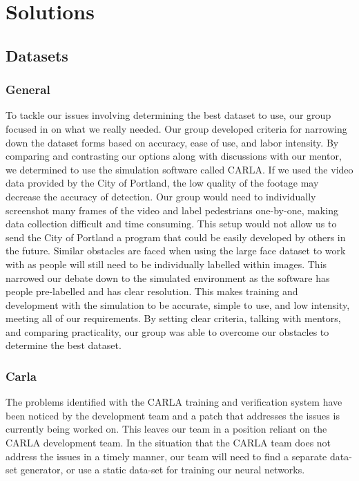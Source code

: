 \section{Solutions}
\subsection{Datasets}
\subsubsection{General}
To tackle our issues involving determining the best dataset to use, our group focused in on what we really needed. Our group developed criteria for narrowing down the dataset forms based on accuracy, ease of use, and labor intensity. By comparing and contrasting our options along with discussions with our mentor, we determined to use the simulation software called CARLA. If we used the video data provided by the City of Portland, the low quality of the footage may decrease the accuracy of detection. Our group would need to individually screenshot many frames of the video and label pedestrians one-by-one, making data collection difficult and time consuming. This setup would not allow us to send the City of Portland a program that could be easily developed by others in the future. Similar obstacles are faced when using the large face dataset to work with as people will still need to be individually labelled within images. This narrowed our debate down to the simulated environment as the software has people pre-labelled and has clear resolution. This makes training and development with the simulation to be accurate, simple to use, and low intensity, meeting all of our requirements. By setting clear criteria, talking with mentors, and comparing practicality, our group was able to overcome our obstacles to determine the best dataset.

\subsubsection{Carla}
The problems identified with the CARLA training and verification system have been noticed by the development team and a patch that addresses the issues is currently being worked on. This leaves our team in a position reliant on the CARLA development team. In the situation that the CARLA team does not address the issues in a timely manner, our team will need to find a separate data-set generator, or use a static data-set for training our neural networks. 

